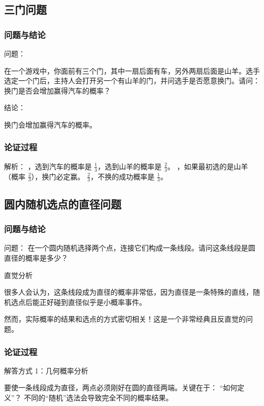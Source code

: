 \subsection{三门问题}

\subsubsection{问题与结论}

问题：

在一个游戏中，你面前有三个门，其中一扇后面有车，另外两扇后面是山羊。选手选定一个门后，主持人会打开另一个有山羊的门，并问选手是否愿意换门。请问：换门是否会增加赢得汽车的概率？

结论：

换门会增加赢得汽车的概率。

\subsubsection{论证过程}


解析：
，选到汽车的概率是 $\frac{1}{3}$，选到山羊的概率是 $\frac{2}{3}$。
，如果最初选的是山羊（概率 $\frac{2}{3}$），换门必定赢。
 $\frac{2}{3}$，不换的成功概率是 $\frac{1}{3}$。



\subsection{圆内随机选点的直径问题}

\subsubsection{问题与结论}
问题：
在一个圆内随机选择两个点，连接它们构成一条线段。请问这条线段是圆直径的概率是多少？

直觉分析

很多人会认为，这条线段成为直径的概率非常低，因为直径是一条特殊的直线，随机选点后能正好碰到直径似乎是小概率事件。

然而，实际概率的结果和选点的方式密切相关！这是一个非常经典且反直觉的问题。


\subsubsection{论证过程}
解答方式 1：几何概率分析

要使一条线段成为直径，两点必须刚好在圆的直径两端。关键在于：
“如何定义”？
不同的“随机”选法会导致完全不同的概率结果。

